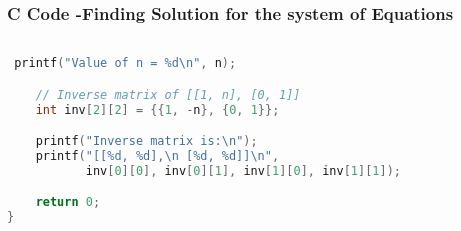 \documentclass{beamer}
\begin{document}
\begin{frame}[fragile]
    \frametitle{C Code -Finding Solution for the system of Equations}

    \begin{lstlisting}[language=C]
    
 printf("Value of n = %d\n", n);

    // Inverse matrix of [[1, n], [0, 1]]
    int inv[2][2] = {{1, -n}, {0, 1}};

    printf("Inverse matrix is:\n");
    printf("[[%d, %d],\n [%d, %d]]\n",
           inv[0][0], inv[0][1], inv[1][0], inv[1][1]);

    return 0;
}


    \end{lstlisting}
\end{frame}
\end{document}
